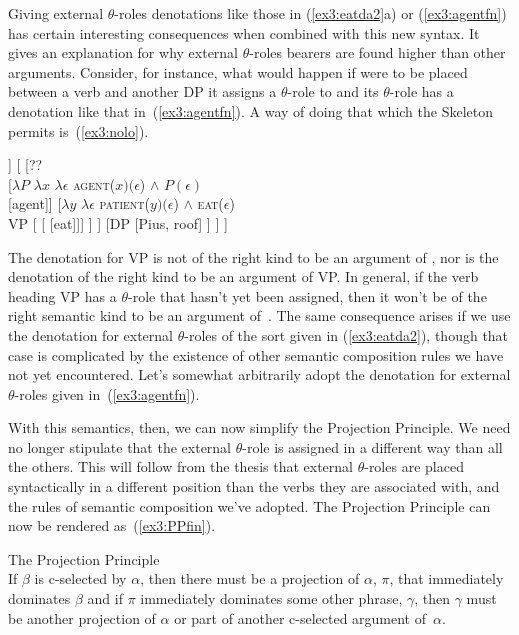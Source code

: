 Giving external $\theta$-roles denotations like those in (\ref{ex3:eatda2}a) or (\ref{ex3:agentfn}) has certain interesting consequences when combined with this new syntax. It gives an explanation for why external $\theta$-roles bearers are found higher than other arguments. Consider, for instance, what would happen if  were to be placed between a verb and another DP it assigns a $\theta$-role to and its $\theta$-role has a denotation like that in~(\ref{ex3:agentfn}). A way of doing that which the  Skeleton permits is~(\ref{ex3:nolo}).
\begin{exe}
	\raggedright
	\ex \label{ex3:nolo} 
	\small
	\begin{forest}
	[vP
		[DP [it, roof]]
		[ 
			[??\\  
				[$\lambda P$ $\lambda x$ $\lambda \epsilon$ \textsc{agent}($x)(\epsilon$) $\wedge$ $P(\epsilon)$\\  [agent]]
				[$\lambda y$ $\lambda \epsilon$ \textsc{patient}($y)(\epsilon$) $\wedge$ \textsc{eat}($\epsilon$)\\ VP [ [ [eat]]] ]
			]
			[DP [Pius, roof] ]
		]
	]
	\end{forest}
\end{exe}
The denotation for VP is not of the right kind to be an argument of , nor is the denotation of  the right kind to be an argument of VP. In general, if the verb heading VP has a $\theta$-role that hasn't yet been assigned, then it won't be of the right semantic kind to be an argument of~. The same consequence arises if we use the denotation for external $\theta$-roles of the sort given in (\ref{ex3:eatda2}), though that case is complicated by the existence of other semantic composition rules we have not yet encountered. Let's somewhat arbitrarily adopt the denotation for external $\theta$-roles given in~(\ref{ex3:agentfn}).

With this semantics, then, we can now simplify the Projection Principle. We need no longer stipulate that the external $\theta$-role is assigned in a different way than all the others. This will follow from the thesis that external $\theta$-roles are placed syntactically in a different position than the verbs they are associated with, and the rules of semantic composition we've adopted. The Projection Principle can now be rendered as~(\ref{ex3:PPfin}).
\begin{exe}
	\raggedright
	\ex \label{ex3:PPfin} The Projection Principle\\
	If $\beta$ is c-selected by $\alpha$, then there must be a projection of $\alpha$, $\pi$, that immediately dominates $\beta$ and if $\pi$ immediately dominates some other phrase, $\gamma$, then $\gamma$ must be another projection of $\alpha$ or part of another c-selected argument of~$\alpha$.
\end{exe}

